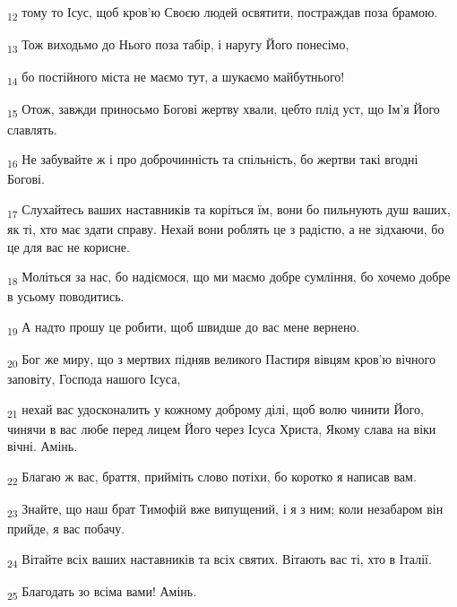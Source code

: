 \begin{tcolorbox}
\textsubscript{12} тому то Ісус, щоб кров'ю Своєю людей освятити, постраждав поза брамою.
\end{tcolorbox}
\begin{tcolorbox}
\textsubscript{13} Тож виходьмо до Нього поза табір, і наругу Його понесімо,
\end{tcolorbox}
\begin{tcolorbox}
\textsubscript{14} бо постійного міста не маємо тут, а шукаємо майбутнього!
\end{tcolorbox}
\begin{tcolorbox}
\textsubscript{15} Отож, завжди приносьмо Богові жертву хвали, цебто плід уст, що Ім'я Його славлять.
\end{tcolorbox}
\begin{tcolorbox}
\textsubscript{16} Не забувайте ж і про доброчинність та спільність, бо жертви такі вгодні Богові.
\end{tcolorbox}
\begin{tcolorbox}
\textsubscript{17} Слухайтесь ваших наставників та коріться їм, вони бо пильнують душ ваших, як ті, хто має здати справу. Нехай вони роблять це з радістю, а не зідхаючи, бо це для вас не корисне.
\end{tcolorbox}
\begin{tcolorbox}
\textsubscript{18} Моліться за нас, бо надіємося, що ми маємо добре сумління, бо хочемо добре в усьому поводитись.
\end{tcolorbox}
\begin{tcolorbox}
\textsubscript{19} А надто прошу це робити, щоб швидше до вас мене вернено.
\end{tcolorbox}
\begin{tcolorbox}
\textsubscript{20} Бог же миру, що з мертвих підняв великого Пастиря вівцям кров'ю вічного заповіту, Господа нашого Ісуса,
\end{tcolorbox}
\begin{tcolorbox}
\textsubscript{21} нехай вас удосконалить у кожному доброму ділі, щоб волю чинити Його, чинячи в вас любе перед лицем Його через Ісуса Христа, Якому слава на віки вічні. Амінь.
\end{tcolorbox}
\begin{tcolorbox}
\textsubscript{22} Благаю ж вас, браття, прийміть слово потіхи, бо коротко я написав вам.
\end{tcolorbox}
\begin{tcolorbox}
\textsubscript{23} Знайте, що наш брат Тимофій вже випущений, і я з ним; коли незабаром він прийде, я вас побачу.
\end{tcolorbox}
\begin{tcolorbox}
\textsubscript{24} Вітайте всіх ваших наставників та всіх святих. Вітають вас ті, хто в Італії.
\end{tcolorbox}
\begin{tcolorbox}
\textsubscript{25} Благодать зо всіма вами! Амінь.
\end{tcolorbox}
